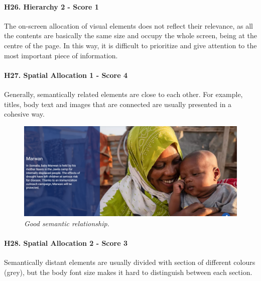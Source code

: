 \paragraph*{H26. Hierarchy 2  - Score 1}
The on-screen allocation of visual elements does not reflect their relevance, as all the contents are basically the same size and occupy the whole screen, being at the centre of the page. In this way, it is difficult to prioritize and give attention to the most important piece of information.

\paragraph*{H27. Spatial Allocation 1  - Score 4}
Generally, semantically related elements are close to each other. For example, titles, body text and images that are connected are usually presented in a cohesive way.

\begin{figure}[h]
	\centering
	\begin{center}
		\includegraphics[width=\textwidth]{Picture30.png}
	\end{center}
	\captionsetup{font=small}
	\caption{\textit{Good semantic relationship.}}
	\label{fig:label23}
\end{figure}

\newpage

\paragraph*{H28. Spatial Allocation 2  - Score 3}
Semantically distant elements are usually divided with section of different colours (grey), but the body font size makes it hard to distinguish between each section.

